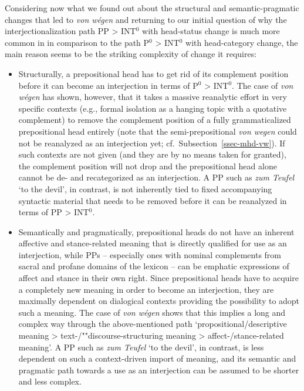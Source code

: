\documentclass[output=paper
  ,nobabel
  ,draftmode
  ,babelshorthands
  ,colorlinks, citecolor=brown
]{langscibook}
\begin{document}
Considering now what we found out about the structural and semantic\hyp pragmatic changes that led to \emph{von wégen} and returning to our initial question of why the interjectionalization path PP > INT$^0$ with head-status change is much more common in  in comparison to the path P$^0$ > INT$^0$ with head-category change, the main reason seems to be the striking complexity of change it requires:

\begin{itemize}
\item	Structurally, a prepositional head has to get rid of its complement position before it can become an interjection in terms of P$^0$ > INT$^0$. The case of \emph{von wégen} has shown, however, that it takes a massive reanalytic effort in very specific contexts (e.g., formal isolation as a hanging topic with a quotative complement) to remove the complement position of a fully grammaticalized prepositional head entirely (note that the semi-prepositional \emph{von wegen} could not be reanalyzed as an interjection yet; cf.\ Subsection~\ref{ssec-mhd-vw}). If such contexts are not given (and they are by no means taken for granted), the complement position will not drop and the prepositional head alone cannot be de- and recategorized as an interjection. A PP such as \emph{zum Teufel} `to the devil', in contrast, is not inherently tied to fixed accompanying syntactic material that needs to be removed before it can be reanalyzed in terms of PP > INT$^0$.

\item Semantically and pragmatically,  prepositional heads do not have an inherent affective
  and stance-related meaning that is directly qualified for use as an interjection, while PPs –
  especially ones with nominal complements from sacral and profane domains of the lexicon – can
  be emphatic expressions of affect and stance in their own right. Since prepositional heads have to
  acquire a completely new meaning in order to become an interjection, they are maximally dependent
  on dialogical contexts providing the possibility to adopt such a meaning. The case of \emph{von
    wégen} shows that this implies a long and complex way through the above-mentioned path
  `propositional/descriptive meaning > text-/""discourse\hyp structuring meaning > affect-/stance-related meaning'. A PP such as \emph{zum Teufel} `to the devil', in contrast, is less dependent on such a context-driven import of meaning, and its semantic and pragmatic path towards a use as an interjection can be assumed to be shorter and less complex.
\end{itemize}
\end{document}
